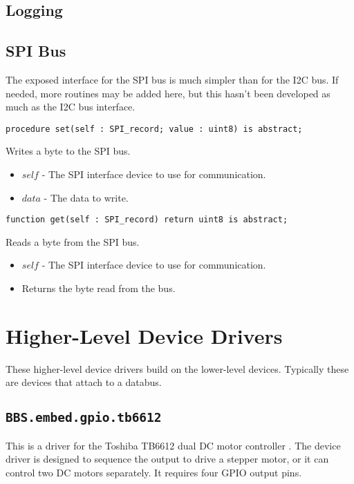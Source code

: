\documentclass[10pt, openany]{book}
\newcommand{\package}[1]{\texttt{#1}}
\newcommand{\comment}[1]{{\color{red}{#1}}}
\begin{document}
\subsection{Logging}
\comment{This is only for debugging purposes.  Should say something here briefly.}

\subsection{SPI Bus}
The exposed interface for the SPI bus is much simpler than for the I2C bus.  If needed, more routines may be added here, but this hasn't been developed as much as the I2C bus interface.
\begin{lstlisting}
procedure set(self : SPI_record; value : uint8) is abstract;
\end{lstlisting}
Writes a byte to the SPI bus.
\begin{itemize}
  \item $self$ - The SPI interface device to use for communication.
  \item $data$ - The data to write.
\end{itemize}
\begin{lstlisting}
function get(self : SPI_record) return uint8 is abstract;
\end{lstlisting}
Reads a byte from the SPI bus.
\begin{itemize}
  \item $self$ - The SPI interface device to use for communication.
  \item Returns the byte read from the bus.
\end{itemize}

\section{Higher-Level Device Drivers}
These higher-level device drivers build on the lower-level devices.  Typically these are devices that attach to a databus.

\subsection{\package{BBS.embed.gpio.tb6612}}
This is a driver for the Toshiba TB6612 dual DC motor controller \cite{TB6612}.  The device driver is designed to sequence the output to drive a stepper motor, or it can control two DC motors separately.  It requires four GPIO output pins.
\end{document}
